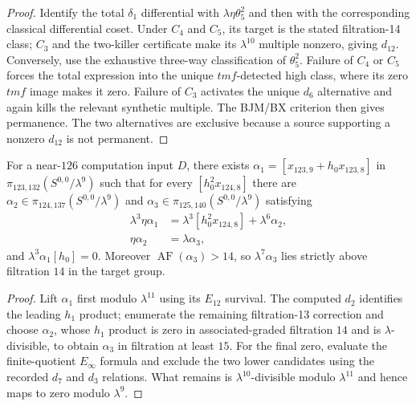 \begin{proof}
  Identify the total $\delta_1$ differential with
  $\lambda\eta\theta_5^2$ and then with the corresponding classical
  differential coset.  Under $C_4$ and $C_5$, its target is the stated
  filtration-14 class; $C_3$ and the two-killer certificate make its
  $\lambda^{10}$ multiple nonzero, giving $d_{12}$.  Conversely, use the
  exhaustive three-way classification of $\theta_5^2$.  Failure of $C_4$ or
  $C_5$ forces the total expression into the unique $tmf$-detected high class,
  where its zero $tmf$ image makes it zero.  Failure of $C_3$ activates the
  unique $d_6$ alternative and again kills the relevant synthetic multiple.
  The BJM/BX criterion then gives permanence.  The two alternatives are
  exclusive because a source supporting a nonzero $d_{12}$ is not permanent.
\end{proof}

\begin{lemma}
  \label{lem:near126-alpha-relations}
  \notready
  For a near-$126$ computation input $D$, there exists
  $\alpha_1=[x_{123,9}+h_0x_{123,8}]$ in
  $\pi_{123,132}(S^{0,0}/\lambda^9)$ such that for every
  $[h_0^2x_{124,8}]$ there are
  $\alpha_2\in\pi_{124,137}(S^{0,0}/\lambda^9)$ and
  $\alpha_3\in\pi_{125,140}(S^{0,0}/\lambda^9)$ satisfying
  \[
  \begin{aligned}
    \lambda^3\eta\alpha_1
      &=\lambda^3[h_0^2x_{124,8}]+\lambda^6\alpha_2,\\
    \eta\alpha_2&=\lambda\alpha_3,
  \end{aligned}
  \]
  and $\lambda^3\alpha_1[h_0]=0$.  Moreover
  $\operatorname{AF}(\alpha_3)>14$, so
  $\lambda^7\alpha_3$ lies strictly above filtration $14$ in the target
  group.
\end{lemma}

\begin{proof}
  Lift $\alpha_1$ first modulo $\lambda^{11}$ using its $E_{12}$ survival.
  The computed $d_2$ identifies the leading $h_1$ product; enumerate the
  remaining filtration-13 correction and choose $\alpha_2$, whose $h_1$
  product is zero in associated-graded filtration $14$ and is
  $\lambda$-divisible, to obtain $\alpha_3$ in filtration at least $15$.
  For the final zero,
  evaluate the finite-quotient $E_\infty$ formula and exclude the two lower
  candidates using the recorded $d_7$ and $d_3$ relations.  What remains is
  $\lambda^{10}$-divisible modulo $\lambda^{11}$ and hence maps to zero modulo
  $\lambda^9$.
\end{proof}

